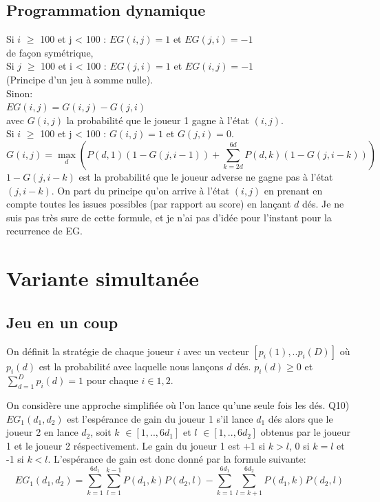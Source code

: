 \documentclass[12pt]{article}
\begin{document}
\subsection{Programmation dynamique}
Si $i$ $\geq$ 100 et j < 100 : $EG(i,j) = 1$ et $EG(j,i) = -1$ 
\\
de façon symétrique,
\\
Si $j$ $\geq$ 100 et i < 100 : $EG(j,i) = 1$ et $EG(i,j) = -1$ 
\\
(Principe d'un jeu à somme nulle).
\\
Sinon:
\\
$EG(i,j) = G(i,j) - G(j,i)$
\\
avec $G(i,j)$ la probabilité que le joueur 1 gagne à l'état $(i,j)$.
\\
Si $i$ $\geq$ 100 et j < 100 : $G(i,j) = 1$ et $G(j,i) = 0$.
$$G(i,j) = \max_d \left( P(d,1)(1-G(j,i-1)) + \sum_{k=2d}^{6d} P(d,k)(1-G(j,i-k))\right)$$
$1-G(j,i-k)$ est la probabilité que le joueur adverse ne gagne pas à l'état $(j,i-k)$. On part du principe qu'on arrive à l'état $(i,j)$ en prenant en compte toutes les issues possibles (par rapport au score) en lançant $d$ dés. Je ne suis pas très sure de cette formule, et je n'ai pas d'idée pour l'instant pour la recurrence de EG.


\section{Variante simultanée}
\subsection{Jeu en un coup}
On définit la stratégie de chaque joueur $i$ avec un vecteur $[p_i(1),.. p_i(D)]$ où $p_i(d)$ est la probabilité avec laquelle nous lançons $d$ dés. $p_i(d) \geq 0 $ et $\sum_{d=1}^D p_i(d) = 1$ pour chaque $i \in {1,2}$.

\newline
On considère une approche simplifiée où l'on lance qu'une seule fois les dés.
\newline
Q10) $EG_1(d_1,d_2)$ est l'espérance de gain du joueur 1 s'il lance $d_1$ dés alors que le joueur 2 en lance $d_2$, soit $k$ $\in [1,..,6d_1]$ et $l$ $\in [1,..,6d_2]$ obtenus par le joueur 1 et le joueur 2 réspectivement. Le gain du joueur 1 est +1 si $k > l$, 0 si $k = l$ et -1 si $k < l$. L'espérance de gain est donc donné par la formule suivante:
$$EG_1(d_1,d_2) = \sum_{k=1}^{6d_1} \sum_{l=1}^{k-1} P(d_1,k)P(d_2,l) - \sum_{k=1}^{6d_1} \sum_{l=k+1}^{6d_2} P(d_1,k)P(d_2,l)$$
\newline
\end{document}
